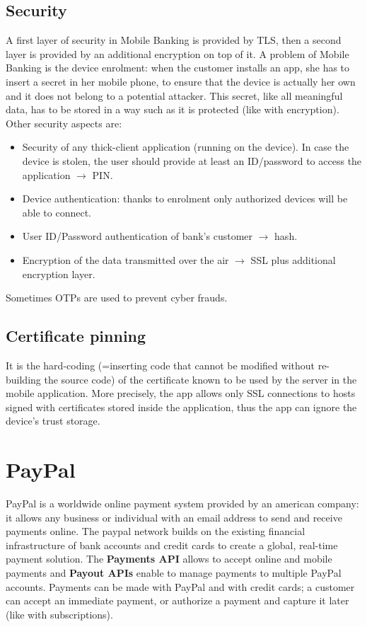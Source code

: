 \documentclass[a4paper, 10pt, titlepage]{article}
\begin{document}
\subsection{Security}
A first layer of security in Mobile Banking is provided by TLS, then a second layer is provided by an additional encryption on top of it. A problem of Mobile Banking is the device enrolment: when the customer installs an app, she has to insert a secret in her mobile phone, to ensure that the device is actually her own and it does not belong to a potential attacker. This secret, like all meaningful data, has to be stored in a way such as it is protected (like with encryption). \medskip\\
Other security aspects are:
\begin{itemize}
\item Security of any thick-client application (running on the device). In case the device is stolen, the user should provide at least an ID/password to access the application $\rightarrow$ PIN.
\item Device authentication: thanks to enrolment only authorized devices will be able to connect.
\item User ID/Password authentication of bank's customer $\rightarrow$ hash.
\item Encryption of the data transmitted over the air $\rightarrow$ SSL plus additional encryption layer.
\end{itemize}
Sometimes OTPs are used to prevent cyber frauds.

\subsection{Certificate pinning}
It is the hard-coding (=inserting code that cannot be modified without re-building the source code) of the certificate known to be used by the server in the mobile application. More precisely, the app allows only SSL connections to hosts signed with certificates stored inside the application, thus the app can ignore the device's trust storage.

\section{PayPal}
PayPal is a worldwide online payment system provided by an american company: it allows any business or individual with an email address to send and receive payments online. The paypal network builds on the existing financial infrastructure of bank accounts and credit cards to create a global, real-time payment solution. The \textbf{Payments API} allows to accept online and mobile payments and \textbf{Payout APIs} enable to manage payments to multiple PayPal accounts. Payments can be made with PayPal and with credit cards; a customer can accept an immediate payment, or authorize a payment and capture it later (like with subscriptions).
\end{document}
